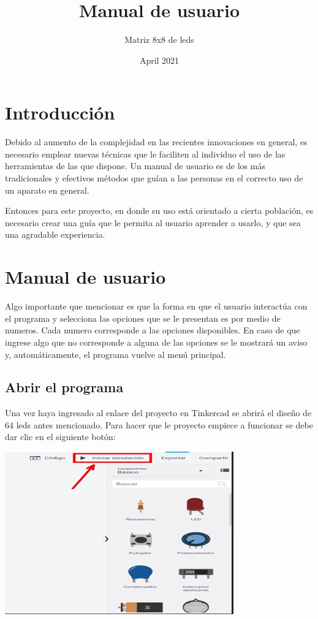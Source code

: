 \documentclass{article}
\title{Manual de usuario}
\author{Matriz 8x8 de leds}
\date{April 2021}
\begin{document}
\maketitle

\section{Introducción}
Debido al aumento de la complejidad en las recientes innovaciones en general, es necesario emplear nuevas técnicas que le faciliten al individuo el uso de las herramientas de las que dispone. Un manual de usuario es de los más tradicionales y efectivos métodos que guían a las personas en el correcto uso de un aparato en general. 

Entonces para este proyecto, en donde su uso está orientado a cierta población, es necesario crear una guía que le permita al usuario aprender a usarlo, y que sea una agradable experiencia.

\section{Manual de usuario}
Algo importante que mencionar es que la forma en que el usuario interactúa con el programa y selecciona las opciones que se le presentan es por medio de numeros. Cada numero corresponde a las opciones disponibles. En caso de que ingrese algo que no corresponde a alguna de las opciones se le mostrará un aviso y, automáticamente, el programa vuelve al menú principal. 

\subsection{Abrir el programa}
Una vez haya ingresado al enlace del proyecto en Tinkercad
se abrirá el diseño de 64 leds antes mencionado.
Para hacer que le proyecto empiece a funcionar se debe dar clic en el siguiente botón:

\includegraphics[scale=0.6]{images/IniciarSimulacion.jpg}
\newline
\end{document}
